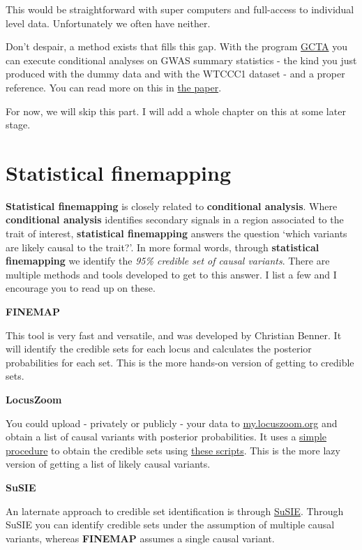 \documentclass[
]{book}
\begin{document}
This would be straightforward with super computers and full-access to individual level data. Unfortunately we often have neither.

Don't despair, a method exists that fills this gap. With the program \href{http://cnsgenomics.com/software/gcta/\#Overview}{GCTA} you can execute conditional analyses on GWAS summary statistics - the kind you just produced with the dummy data and with the WTCCC1 dataset - and a proper reference. You can read more on this in \href{https://www.nature.com/articles/ng.2213}{the paper}.

For now, we will skip this part. I will add a whole chapter on this at some later stage.

\hypertarget{statistical-finemapping}{%
\section{Statistical finemapping}\label{statistical-finemapping}}

\textbf{Statistical finemapping} is closely related to \textbf{conditional analysis}. Where \textbf{conditional analysis} identifies secondary signals in a region associated to the trait of interest, \textbf{statistical finemapping} answers the question `which variants are likely causal to the trait?'. In more formal words, through \textbf{statistical finemapping} we identify the \emph{95\% credible set of causal variants}.
There are multiple methods and tools developed to get to this answer. I list a few and I encourage you to read up on these.

\textbf{FINEMAP}

This tool is very fast and versatile, and was developed by Christian Benner. It will identify the credible sets for each locus and calculates the posterior probabilities for each set. This is the more hands-on version of getting to credible sets.

\textbf{LocusZoom}

You could upload - privately or publicly - your data to \href{https://my.locuszoom.org}{my.locuszoom.org} and obtain a list of causal variants with posterior probabilities. It uses a \href{https://statgen.github.io/gwas-credible-sets/method/locuszoom-credible-sets.pdf}{simple procedure} to obtain the credible sets using \href{https://github.com/statgen/gwas-credible-sets/}{these scripts}. This is the more lazy version of getting a list of likely causal variants.

\textbf{SuSIE}

An laternate approach to credible set identification is through \href{https://stephenslab.github.io/susieR/index.html}{SuSIE}. Through SuSIE you can identify credible sets under the assumption of multiple causal variants, whereas \textbf{FINEMAP} assumes a single causal variant.
\end{document}
